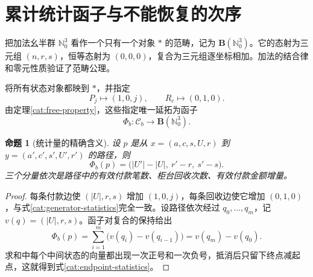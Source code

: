 \documentclass[UTF8,a4paper]{ctexbook}
\newtheorem{proposition}[theorem]{命题}
\theoremstyle{definition}
\numberwithin{equation}{chapter}
\newcommand{\1}{\mathbf{1}}
\begin{document}
\section{累计统计函子与不能恢复的次序}

把加法幺半群 $\mathbb N_0^3$ 看作一个只有一个对象 $*$ 的范畴，记为 $\mathbf B(\mathbb N_0^3)$。它的态射为三元组 $(n,r,s)$，恒等态射为 $(0,0,0)$，复合为三元组逐坐标相加。加法的结合律和零元性质验证了范畴公理。

将所有状态对象都映到 $*$，并指定
\begin{equation}\label{cat:generator-statistics}
P_j\longmapsto(1,0,j),\qquad
R_c\longmapsto(0,1,0).
\end{equation}
由定理\ref{cat:free-property}，这些指定唯一延拓为函子
\[
\Phi_b:\mathcal C_b\longrightarrow\mathbf B(\mathbb N_0^3).
\]

\begin{proposition}[统计量的精确含义]\label{cat:statistics}
设 $p$ 是从 $x=(a,c,s,U,r)$ 到 $y=(a',c',s',U',r')$ 的路径，则
\begin{equation}\label{cat:endpoint-statistics}
\Phi_b(p)=\bigl(|U'|-|U|,\ r'-r,\ s'-s\bigr).
\end{equation}
三个分量依次是路径中的有效付款笔数、柜台回收次数、有效付款金额增量。
\end{proposition}
\begin{proof}
每条付款边使 $(|U|,r,s)$ 增加 $(1,0,j)$，每条回收边使它增加 $(0,1,0)$，与式\eqref{cat:generator-statistics}完全一致。设路径依次经过 $q_0,\ldots,q_m$，记 $v(q)=(|U|,r,s)$。函子对复合的保持给出
\[
\Phi_b(p)=\sum_{i=1}^{m}\bigl(v(q_i)-v(q_{i-1})\bigr)
=v(q_m)-v(q_0).
\]
求和中每个中间状态的向量都出现一次正号和一次负号，抵消后只留下终点减起点，这就得到式\eqref{cat:endpoint-statistics}。
\end{proof}
\end{document}
